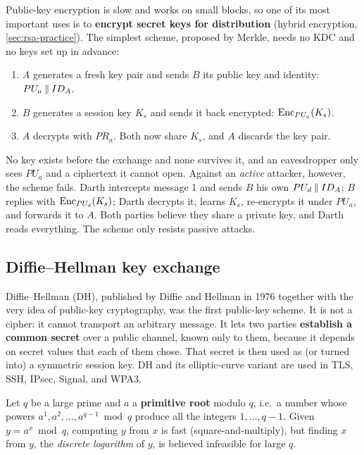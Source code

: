 Public-key encryption is slow and works on small blocks, so one of its most important uses is to \textbf{encrypt secret keys for distribution} (hybrid encryption, \cref{sec:rsa-practice}). The simplest scheme, proposed by Merkle, needs no KDC and no keys set up in advance:
\begin{enumerate}
    \item $A$ generates a fresh key pair and sends $B$ its public key and identity: $PU_a \mathbin{\|} ID_A$.
    \item $B$ generates a session key $K_s$ and sends it back encrypted: $\operatorname{Enc}_{PU_a}(K_s)$.
    \item $A$ decrypts with $PR_a$. Both now share $K_s$, and $A$ discards the key pair.
\end{enumerate}
No key exists before the exchange and none survives it, and an eavesdropper only sees $PU_a$ and a ciphertext it cannot open. Against an \emph{active} attacker, however, the scheme fails. Darth intercepts message 1 and sends $B$ his own $PU_d \mathbin{\|} ID_A$; $B$ replies with $\operatorname{Enc}_{PU_d}(K_s)$; Darth decrypts it, learns $K_s$, re-encrypts it under $PU_a$, and forwards it to $A$. Both parties believe they share a private key, and Darth reads everything. The scheme only resists passive attacks.

\subsection{Diffie--Hellman key exchange}

Diffie--Hellman (DH), published by Diffie and Hellman in 1976 \cite{diffie1976} together with the very idea of public-key cryptography, was the first public-key scheme. It is not a cipher: it cannot transport an arbitrary message. It lets two parties \textbf{establish a common secret} over a public channel, known only to them, because it depends on secret values that each of them chose. That secret is then used as (or turned into) a symmetric session key. DH and its elliptic-curve variant are used in TLS, SSH, IPsec, Signal, and WPA3.

\begin{definition}
Let $q$ be a large prime and $a$ a \textbf{primitive root} modulo $q$, i.e.\ a number whose powers $a^1, a^2, \dots, a^{q-1} \bmod q$ produce all the integers $1, \dots, q-1$. Given $y = a^x \bmod q$, computing $y$ from $x$ is fast (square-and-multiply), but finding $x$ from $y$, the \emph{discrete logarithm} of $y$, is believed infeasible for large $q$.
\end{definition}

